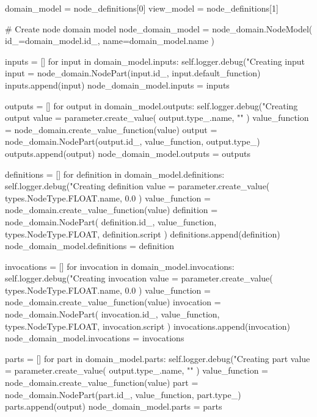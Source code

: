 \documentclass[%
    a4paper,    %
    justified,  %
    nobib,      %
    openany     %
]{tufte-book}
\begin{document}
\begin{fullwidth}
\begin{flushleft}
\begin{minipage}{\linewidth}
\begin{pythoncode}
        domain_model = node_definitions[0]
        view_model   = node_definitions[1]

        # Create node domain model
        node_domain_model = node_domain.NodeModel(
            id_=domain_model.id_,
            name=domain_model.name
        )

        inputs = []
        for input in domain_model.inputs:
            self.logger.debug("Creating input %
            input = node_domain.NodePart(input.id_, input.default_function)
            inputs.append(input)
        node_domain_model.inputs = inputs

        outputs = []
        for output in domain_model.outputs:
            self.logger.debug("Creating output %
            value = parameter.create_value(
                output.type_.name, ""
            )
            value_function = node_domain.create_value_function(value)
            output = node_domain.NodePart(output.id_, value_function, output.type_)
            outputs.append(output)
        node_domain_model.outputs = outputs

        definitions = []
        for definition in domain_model.definitions:
            self.logger.debug("Creating definition %
            value = parameter.create_value(
                types.NodeType.FLOAT.name, 0.0
            )
            value_function = node_domain.create_value_function(value)
            definition = node_domain.NodePart(
                definition.id_, value_function, types.NodeType.FLOAT, definition.script
            )
            definitions.append(definition)
        node_domain_model.definitions = definition

        invocations = []
        for invocation in domain_model.invocations:
            self.logger.debug("Creating invocation %
            value = parameter.create_value(
                types.NodeType.FLOAT.name, 0.0
            )
            value_function = node_domain.create_value_function(value)
            invocation = node_domain.NodePart(
                invocation.id_, value_function, types.NodeType.FLOAT, invocation.script
            )
            invocations.append(invocation)
        node_domain_model.invocations = invocations

        parts = []
        for part in domain_model.parts:
            self.logger.debug("Creating part %
            value = parameter.create_value(
                output.type_.name, ""
            )
            value_function = node_domain.create_value_function(value)
            part = node_domain.NodePart(part.id_, value_function, part.type_)
            parts.append(output)
        node_domain_model.parts = parts


\end{pythoncode}
\end{minipage}
\end{flushleft}
\end{fullwidth}
\end{document}
